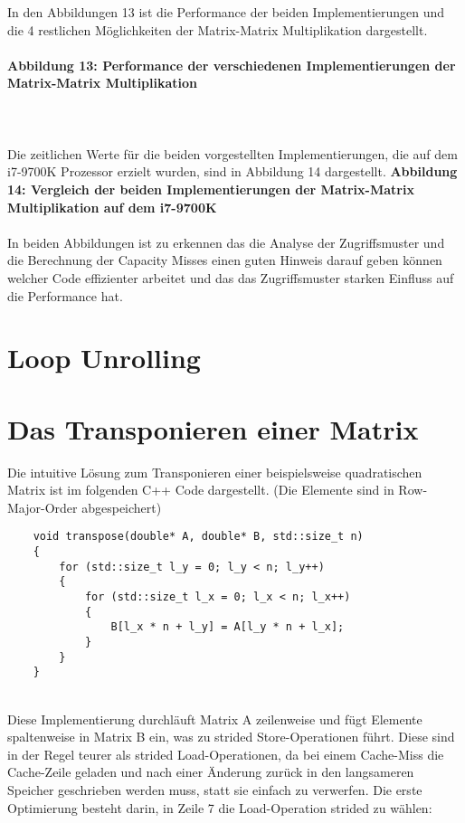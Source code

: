 \documentclass[sigconf,language=english]{acmart}
\begin{document}
In den Abbildungen 13 ist die Performance der beiden Implementierungen und die 4 restlichen 
Möglichkeiten der Matrix-Matrix Multiplikation dargestellt.\\\\ %
\textbf{Abbildung 13: Performance der verschiedenen Implementierungen der Matrix-Matrix Multiplikation}
\\\\\\\\
Die zeitlichen Werte für die beiden vorgestellten Implementierungen, 
die auf dem i7-9700K Prozessor erzielt wurden, sind in Abbildung 14 dargestellt.
\textbf{Abbildung 14: Vergleich der beiden Implementierungen der Matrix-Matrix Multiplikation auf dem i7-9700K}
\\\\
In beiden Abbildungen ist zu erkennen das die Analyse der Zugriffsmuster und die Berechnung der Capacity Misses
einen guten Hinweis darauf geben können welcher Code effizienter arbeitet und das das Zugriffsmuster starken
Einfluss auf die Performance hat.

\section{Loop Unrolling}




\section{Das Transponieren einer Matrix}

Die intuitive Lösung zum Transponieren einer beispielsweise quadratischen Matrix ist im folgenden C++ Code dargestellt.
(Die Elemente sind in Row-Major-Order abgespeichert)\\

\begin{verbatim}
    void transpose(double* A, double* B, std::size_t n)
    {
        for (std::size_t l_y = 0; l_y < n; l_y++)
        {
            for (std::size_t l_x = 0; l_x < n; l_x++)
            {
                B[l_x * n + l_y] = A[l_y * n + l_x];
            }
        }
    }
\end{verbatim}
\,\\
Diese Implementierung durchläuft Matrix A zeilenweise und fügt Elemente spaltenweise in Matrix B ein,
was zu strided Store-Operationen führt. Diese sind in der Regel teurer als strided Load-Operationen,
da bei einem Cache-Miss die Cache-Zeile geladen und nach einer Änderung 
zurück in den langsameren Speicher geschrieben werden muss, statt sie einfach zu verwerfen.
Die erste Optimierung besteht darin, in Zeile 7 die Load-Operation strided zu wählen:
\end{document}
